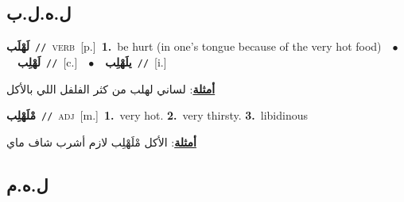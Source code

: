 \documentclass[10pt,a4paper,twoside]{article} %
\begin{document}
\begin{multicols}{2}
\vspace{-3mm}
\subsection*{\color{blue}\foreignlanguage{arabic}{ل.ه.ل.ب}\color{blue}{}} 

{\setlength\topsep{0pt}\textbf{\foreignlanguage{arabic}{لَهْلَب}}\ {\color{gray}\texttt{//}\color{black}}\ \textsc{verb}\ [p.]\ \textbf{1.}~be hurt (in one's tongue because of the very hot food)\ \ $\bullet$\ \ \setlength\topsep{0pt}\textbf{\foreignlanguage{arabic}{لَهْلِب}}\ {\color{gray}\texttt{//}\color{black}}\ [c.]\ \ $\bullet$\ \ \setlength\topsep{0pt}\textbf{\foreignlanguage{arabic}{يلَهْلِب}}\ {\color{gray}\texttt{//}\color{black}}\ [i.]\  \begin{flushright}\color{gray}\foreignlanguage{arabic}{\textbf{\underline{\foreignlanguage{arabic}{أمثلة}}}: لساني لهلب من كثر الفلفل اللي بالأكل}\end{flushright}\color{black}} \vspace{2mm}

{\setlength\topsep{0pt}\textbf{\foreignlanguage{arabic}{مْلَهْلِب}}\ {\color{gray}\texttt{//}\color{black}}\ \textsc{adj}\ [m.]\ \textbf{1.}~very hot.  \textbf{2.}~very thirsty.  \textbf{3.}~libidinous\  \begin{flushright}\color{gray}\foreignlanguage{arabic}{\textbf{\underline{\foreignlanguage{arabic}{أمثلة}}}: الأكل مْلَهْلِب لازم أشرب شاف ماي}\end{flushright}\color{black}} \vspace{2mm}

\vspace{-3mm}
\subsection*{\color{blue}\foreignlanguage{arabic}{ل.ه.م}\color{blue}{}} 


\end{multicols}
\end{document}
